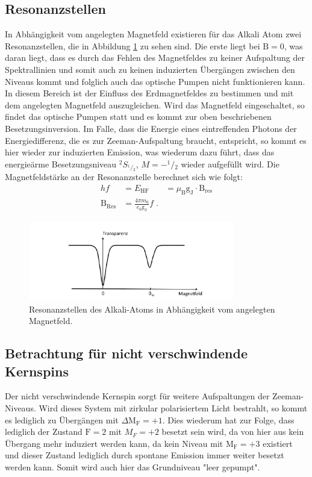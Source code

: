 \subsection{Resonanzstellen}
In Abhängigkeit vom angelegten Magnetfeld existieren für das Alkali Atom zwei Resonanzstellen, die in Abbildung \ref{abb:Resonanz} zu sehen sind. Die erste liegt bei $\text{B}=0$, was daran liegt, dass es durch das Fehlen des Magnetfeldes zu keiner Aufspaltung der Spektrallinien und somit auch zu keinen induzierten Übergängen zwischen den Niveaus kommt und folglich auch das optische Pumpen nicht funktionieren kann.
In diesem Bereich ist der Einfluss des Erdmagnetfeldes zu bestimmen und mit dem angelegten Magnetfeld auszugleichen.
Wird das Magnetfeld eingeschaltet, so findet das optische Pumpen statt und es kommt zur oben beschriebenen Besetzungsinversion.
Im Falle, dass die Energie eines eintreffenden Photons der Energiedifferenz, die es zur Zeeman-Aufspaltung braucht, entspricht, so kommt es hier wieder zur induzierten Emission, was wiederum dazu führt, dass das energieärme Besetzungsniveau ${}^2S_{{}^1\!/\!_2}$, $M=-^1\!/\!_2$ wieder aufgefüllt wird.
Die Magnetfeldstärke an der Resonanzstelle berechnet sich wie folgt:
\begin{align*}
    hf &= E_{\text{HF}} &= \mu_{\text{B}} \text{g}_{\text{J}} \cdot \text{B}_{\text{res}} \\
    \text{B}_{\text{Res}} &= \frac{4\pi m_0}{e_0 \text{g}_{\text{J}}}f \; .
\end{align*}
\FloatBarrier
\begin{figure}
    \centering
    \includegraphics[width=0.8\textwidth]{Resonanz.PNG}
    \caption{Resonanzstellen des Alkali-Atoms in Abhängigkeit vom angelegten Magnetfeld.}
    \label{abb:Resonanz}
\end{figure}
\FloatBarrier

\subsection{Betrachtung für nicht verschwindende Kernspins}
Der nicht verschwindende Kernspin sorgt für weitere Aufspaltungen der Zeeman-Niveaus.
Wird dieses System mit zirkular polarisiertem Licht bestrahlt, so kommt
es lediglich zu Übergängen mit $\Delta \text{M}_{\text{F}} = +1$.
Dies wiederum hat zur Folge, dass lediglich der Zustand $\text{F}=2$ mit $M_F=+2$ besetzt sein wird, da von hier aus kein Übergang mehr induziert werden kann, da kein Niveau mit $\text{M}_{\text{F}}=+3$ existiert und dieser Zustand lediglich durch spontane Emission immer weiter besetzt werden kann.
Somit wird auch hier das Grundniveau "leer gepumpt".

